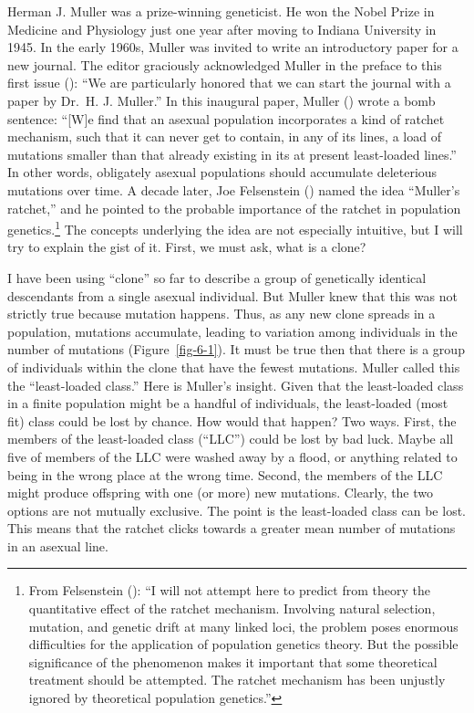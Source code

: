 \documentclass[
  american,
  letterpaper,
]{book}
\begin{document}
Herman J. Muller was a prize-winning geneticist. He won the Nobel Prize
in Medicine and Physiology just one year after moving to Indiana
University in 1945. In the early 1960s, Muller was invited to write an
introductory paper for a new journal. The editor graciously acknowledged
Muller in the preface to this first issue
(): ``We are particularly honored
that we can start the journal with a paper by Dr.~H. J. Muller.'' In
this inaugural paper, Muller () wrote a
bomb sentence: ``{[}W{]}e find that an asexual population incorporates a
kind of ratchet mechanism, such that it can never get to contain, in any
of its lines, a load of mutations smaller than that already existing in
its at present least-loaded lines.'' In other words, obligately asexual
populations should accumulate deleterious mutations over time. A decade
later, Joe Felsenstein () named the
idea ``Muller's ratchet,'' and he pointed to the probable importance of
the ratchet in population genetics.\footnote{From Felsenstein
  (): ``I will not attempt here to
  predict from theory the quantitative effect of the ratchet mechanism.
  Involving natural selection, mutation, and genetic drift at many
  linked loci, the problem poses enormous difficulties for the
  application of population genetics theory. But the possible
  significance of the phenomenon makes it important that some
  theoretical treatment should be attempted. The ratchet mechanism has
  been unjustly ignored by theoretical population genetics.''} The
concepts underlying the idea are not especially intuitive, but I will
try to explain the gist of it. First, we must ask, what is a clone?

I have been using ``clone'' so far to describe a group of genetically
identical descendants from a single asexual individual. But Muller knew
that this was not strictly true because mutation happens. Thus, as any
new clone spreads in a population, mutations accumulate, leading to
variation among individuals in the number of mutations
(Figure~\ref{fig-6-1}). It must be true then that there is a group of
individuals within the clone that have the fewest mutations. Muller
called this the ``least-loaded class.'' Here is Muller's insight. Given
that the least-loaded class in a finite population might be a handful of
individuals, the least-loaded (most fit) class could be lost by chance.
How would that happen? Two ways. First, the members of the least-loaded
class (``LLC'') could be lost by bad luck. Maybe all five of members of
the LLC were washed away by a flood, or anything related to being in the
wrong place at the wrong time. Second, the members of the LLC might
produce offspring with one (or more) new mutations. Clearly, the two
options are not mutually exclusive. The point is the least-loaded class
can be lost. This means that the ratchet clicks towards a greater mean
number of mutations in an asexual line.
\end{document}
